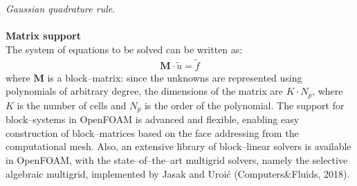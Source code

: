 \documentclass[b1b,portrait]{b0poster}
\begin{document}
\begin{minipage}[t][79cm][t]{0.3\linewidth}
\textit{Gaussian quadrature rule}. \\
  \large
  \textcolor{fsbBlue}{%
    \Large \bfseries
    \\Matrix support
  }\\
The system of equations to be solved can be written as:
\begin{align*}
\mathbf{M} \cdot \tilde{u} = \tilde{f}
\end{align*}
where $\mathbf{M}$ is a block--matrix: since the unknowns are represented using
polynomials of arbitrary degree, the dimensions of the matrix are $K \cdot N_p$,
where $K$ is the number of cells and $N_p$ is the order of the polynomial. The
support for block--systems in OpenFOAM is advanced and flexible, enabling easy
construction of block--matrices based on the face addressing from the
computational mesh. Also, an extensive library of block--linear solvers is
available in OpenFOAM, with the state--of--the--art multigrid solvers, namely
the selective algebraic multigrid, implemented by Jasak and Uroi\'{c}
(Computers\&Fluids, 2018).\\


\end{minipage}
%
\hspace{1cm}
\end{document}
